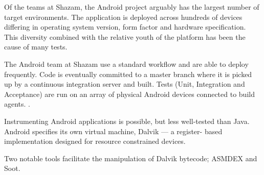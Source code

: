 Of the teams at Shazam, the Android project arguably has the largest number of
target environments. The application is deployed across hundreds of devices
differing in operating system version, form factor and hardware specification.
This diversity combined with the relative youth of the platform has been the
cause of many \flaky tests.

The Android team at Shazam use a standard workflow and are able to deploy
frequently. Code is eventually committed to a master branch where it is picked
up by a continuous integration server and built. Tests (Unit, Integration and
Acceptance) are run on an array of physical Android devices connected to build
agents. .

Instrumenting Android applications is possible, but less well-tested than Java.
Android specifies its own virtual machine, Dalvik\cite{dalvik} --- a register-
based implementation designed for resource constrained devices.

Two notable tools facilitate the manipulation of Dalvik bytecode;
ASMDEX\cite{asmDex} and Soot\cite{vall99soot}.
